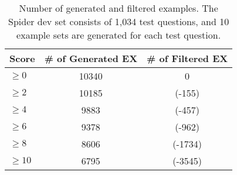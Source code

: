 \begin{table}[t]
    \centering
    \begin{tabular}{lcc}
        \toprule
        Score & \# of Generated EX & \# of Filtered EX\\
        \midrule
        \textbf{$\geq 0$} & 10340 & 0\\ 
        \textbf{$\geq 2$} & 10185  & (-155) \\
        \textbf{$\geq 4$} & 9883 & (-457)  \\
        \textbf{$\geq 6$} & 9378 & (-962)  \\
        \textbf{$\geq 8$}& 8606 & (-1734)\\
        \textbf{$\geq 10$} & 6795 & (-3545)  \\
        \bottomrule
    \end{tabular}
    \caption{Number of generated and filtered examples. The Spider dev set consists of 1,034 test questions, and 10 example sets are  generated for each test question.}
    \label{tab:full_number_of_generated}
\end{table}

